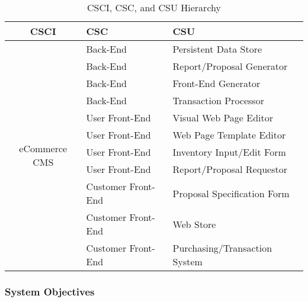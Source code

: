 \documentclass{article}
\begin{document}
\begin{table}
    \begin{tabular}{|c|l|p{7.5cm}|}\hline
        CSCI & CSC & CSU \\\hline\hline
        \multirow{12}{*}{eCommerce CMS}
         & Back-End & Persistent Data Store \\\cline{2-3}
         & Back-End & Report/Proposal Generator \\\cline{2-3}
         & Back-End & Front-End Generator \\\cline{2-3}
         & Back-End & Transaction Processor \\\cline{2-3}
         & User Front-End & Visual Web Page Editor \\\cline{2-3}
         & User Front-End & Web Page Template Editor \\\cline{2-3}
         & User Front-End & Inventory Input/Edit Form \\\cline{2-3}
         & User Front-End & Report/Proposal Requestor \\\cline{2-3}
         & Customer Front-End & Proposal Specification Form \\\cline{2-3}
         & Customer Front-End & Web Store \\\cline{2-3}
         & Customer Front-End & Purchasing/Transaction System \\\hline
    \end{tabular}
    \caption{CSCI, CSC, and CSU Hierarchy}
    \label{software-hierarchy}
\end{table}

\subsubsection{System Objectives}


\end{document}
